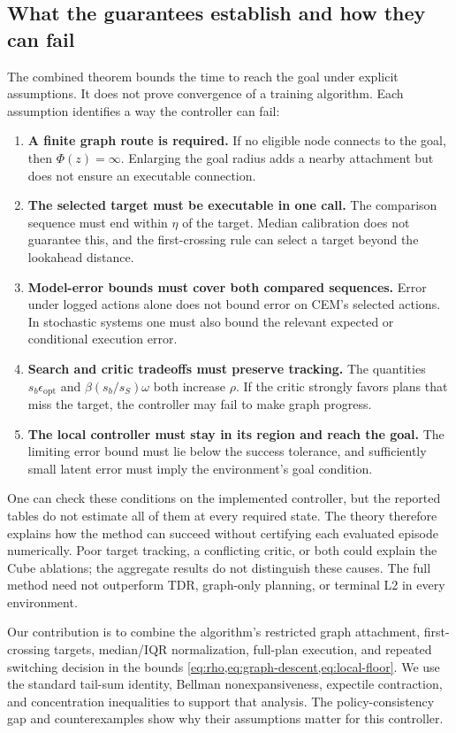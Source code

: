 \documentclass{article} %
\theoremstyle{definition}
\theoremstyle{remark}
\begin{document}
\subsection{What the guarantees establish and how they can fail}
\label{app:theory-scope}
The combined theorem bounds the time to reach the goal under explicit assumptions.
It does not prove convergence of a training algorithm. Each assumption identifies
a way the controller can fail:
\begin{enumerate}[leftmargin=*,itemsep=3pt]
 \item \textbf{A finite graph route is required.}
       If no eligible node connects to the goal, then $\Phi(z)=\infty$.
       Enlarging the goal radius adds a nearby attachment but does not ensure an executable connection.
 \item \textbf{The selected target must be executable in one call.}
       The comparison sequence must end within $\eta$ of the target. Median calibration
       does not guarantee this, and the first-crossing rule can select a target beyond the lookahead distance.
 \item \textbf{Model-error bounds must cover both compared sequences.}
       Error under logged actions alone does not bound error on CEM's selected actions.
       In stochastic systems one must also bound the relevant expected or conditional execution error.
 \item \textbf{Search and critic tradeoffs must preserve tracking.}
       The quantities $s_b\epsilon_{\mathrm{opt}}$ and
       $\beta(s_b/s_S)\omega$ both increase $\rho$. If the critic strongly favors plans
       that miss the target, the controller may fail to make graph progress.
 \item \textbf{The local controller must stay in its region and reach the goal.}
       The limiting error bound must lie below the success tolerance, and sufficiently
       small latent error must imply the environment's goal condition.
\end{enumerate}

One can check these conditions on the implemented controller, but the reported tables
do not estimate all of them at every required state. The theory therefore explains
how the method can succeed without certifying each evaluated episode numerically.
Poor target tracking, a conflicting critic, or both could explain the Cube ablations;
the aggregate results do not distinguish these causes. The full method need not
outperform TDR, graph-only planning, or terminal L2 in every environment.

Our contribution is to combine the algorithm's restricted graph attachment,
first-crossing targets, median/IQR normalization, full-plan execution, and repeated
switching decision in the bounds \cref{eq:rho,eq:graph-descent,eq:local-floor}.
We use the standard tail-sum identity, Bellman nonexpansiveness, expectile contraction,
and concentration inequalities to support that analysis. The policy-consistency gap
and counterexamples show why their assumptions matter for this controller.
\label{app:theory-end}
\end{document}
